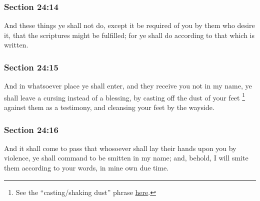 	\subsubsection{Section 24:14} %
		\label{DC24-14}

		And these things ye shall not do, except it be required of you by them who desire it, that the scriptures might be fulfilled; for ye shall do according to that which is written.


	\subsubsection{Section 24:15} %
		\label{DC24-15}

		And in whatsoever place ye shall enter, and they receive you not in my name, ye shall leave a cursing instead of a blessing, by casting off the dust of your feet%
			\footnote{%
				See the ``casting/shaking dust'' phrase \hyperref[DUST-PHRASES]{here}.
				}
		against them as a testimony, and cleansing your feet by the wayside.


	\subsubsection{Section 24:16} %
		\label{DC24-16}

		And it shall come to pass that whosoever shall lay their hands upon you by violence, ye shall command to be smitten in my name; and, behold, I will smite them according to your words, in mine own due time.

